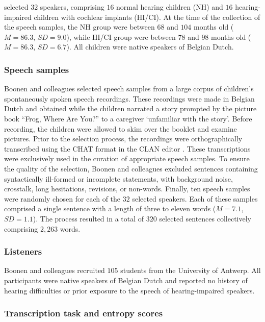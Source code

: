 \documentclass[
  authoryear,
  preprint,
  1p]{elsarticle}
\begin{document}
\citet{Boonen_et_al_2021} selected \(32\) speakers, comprising \(16\)
normal hearing children (NH) and \(16\) hearing-impaired children with
cochlear implants (HI/CI). At the time of the collection of the speech
samples, the NH group were between \(68\) and \(104\) months old
(\(M=86.3\), \(SD=9.0\)), while HI/CI group were between \(78\) and
\(98\) months old (\(M=86.3\), \(SD=6.7\)). {All children were native
speakers of Belgian Dutch.}

\subsubsection{Speech samples}\label{sec-M-SS}

Boonen and colleagues selected speech samples from a large corpus of
children's spontaneously spoken speech recordings. These recordings were
{made in Belgian Dutch and obtained while} the children narrated a story
prompted by the picture book ``Frog, Where Are You?'' \citep{Mayer_1969}
to a caregiver `unfamiliar with the story'. Before recording, the
children were allowed to skim over the booklet and examine pictures.
Prior to the selection process, the recordings were orthographically
transcribed using the CHAT format in the CLAN editor
\citep{MacWhinney_2020}. These transcriptions were exclusively used in
the curation of appropriate speech samples. To ensure the quality of the
selection, Boonen and colleagues excluded sentences containing
syntactically ill-formed or incomplete statements, with background
noise, crosstalk, long hesitations, revisions, or non-words. Finally,
ten speech samples were randomly chosen for each of the \(32\) selected
speakers. Each of these samples comprised a single sentence with a
length of three to eleven words (\(M=7.1\), \(SD=1.1\)). The process
resulted in a total of \(320\) selected sentences collectively
comprising \(2,263\) words.

\subsubsection{Listeners}\label{sec-M-L}

Boonen and colleagues recruited \(105\) students from the University of
Antwerp. All participants were native speakers of Belgian Dutch and
reported no history of hearing difficulties or prior exposure to the
speech of hearing-impaired speakers.

\subsubsection{Transcription task and entropy scores}\label{sec-M-TS}
\end{document}
